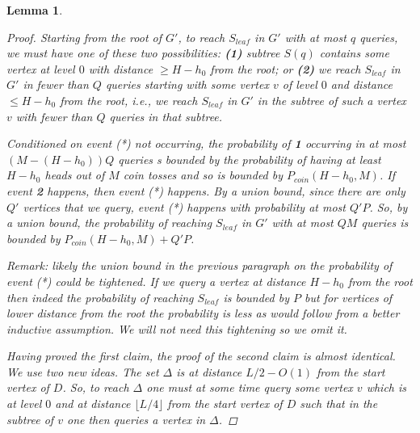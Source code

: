 \documentclass[letterpaper,onecolumn]{quantumarticle}
\newtheorem{lemma}{Lemma}
\newcommand{\Pbias}{P_{coin}}
\newcommand{\glen}{L}
\begin{document}
\begin{lemma}
\begin{proof}
Starting from the root of $G'$, to reach $S_{leaf}$ in $G'$ with at most $q$ queries, we must have one of these two possibilities: {\bf (1)} subtree $S(q)$ contains some vertex at level $0$ with distance $\geq H-h_0$ from the root; 
or {\bf (2)} we reach $S_{leaf}$ in $G'$ in fewer than $Q$ queries starting with some vertex $v$ of level $0$ and distance $\leq H-h_0$ from the root, i.e., we reach $S_{leaf}$ in $G'$ in the subtree of such a vertex $v$ with fewer than $Q$ queries in that subtree.

Conditioned on event (*) not occurring,
the probability of {\bf 1} occurring in at most $(M-(H-h_0))Q$ queries s bounded by the probability of having at least $H-h_0$ heads out of $M$ coin tosses and so is bounded by
$\Pbias(H-h_0,M)$.
If event {\bf 2} happens, then event (*) happens.
By a union bound, since there are only $Q'$ vertices that we query, event (*) happens with probability at most $Q' P$. 
So, by a union bound, the probability of reaching $S_{leaf}$ in $G'$ with at most $QM$ queries is bounded by
$\Pbias(H-h_0,M)+Q'P$.

Remark: likely the union bound in the previous paragraph on the probability of event (*) could be tightened.
If we query a vertex at distance $H-h_0$ from the root then indeed the probability of reaching $S_{leaf}$ is bounded by $P$ but for vertices of lower distance from the root the probability is less as would follow from a better inductive assumption.  We will not need this tightening so we omit it.

Having proved the first claim, the proof of the second claim is almost identical.
We use two new ideas.
The set $\Delta$ is at distance $\glen/2-O(1)$ from the start vertex of $D$.  So, to reach $\Delta$ one must at some time query some vertex $v$ which is at level $0$ and at distance $\lfloor \glen/4 \rfloor $ from the start vertex of $D$ such that in the subtree of $v$ one then queries a vertex in $\Delta$.


\end{proof}
\end{lemma}
\end{document}
